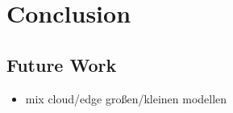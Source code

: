 \chapter{Conclusion}
\label{chap:conclusion}
\section{Future Work}
\begin{itemize}
    \item mix cloud/edge großen/kleinen modellen
\end{itemize}
\endinput 

